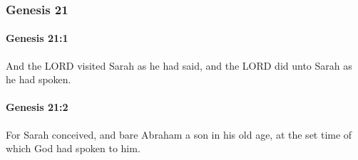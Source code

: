 	\subsubsection{Genesis 21} %
		\label{GENESIS-21}

		\paragraph{Genesis 21:1} %
			\label{GENESIS-21-1}

			And the LORD visited Sarah as he had said, and the LORD did unto Sarah as he had spoken.


		\paragraph{Genesis 21:2} %
			\label{GENESIS-21-2}

			For Sarah conceived, and bare Abraham a son in his old age, at the set time of which God had spoken to him.

